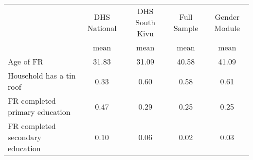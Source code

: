 {
\def\sym#1{\ifmmode^{#1}\else\(^{#1}\)\fi}
\begin{tabular}{l*{4}{c}}
\hline\hline
                    &\multicolumn{1}{c}{DHS National}&\multicolumn{1}{c}{DHS South Kivu}&\multicolumn{1}{c}{Full Sample}&\multicolumn{1}{c}{Gender Module}\\
                    &        mean&        mean&        mean&        mean\\
\hline
Age of FR           &       31.83&       31.09&       40.58&       41.09\\
Household has a tin roof&        0.33&        0.60&        0.58&        0.61\\
FR completed primary education&        0.47&        0.29&        0.25&        0.25\\
FR completed secondary education&        0.10&        0.06&        0.02&        0.03\\
\hline\hline
\end{tabular}
}
